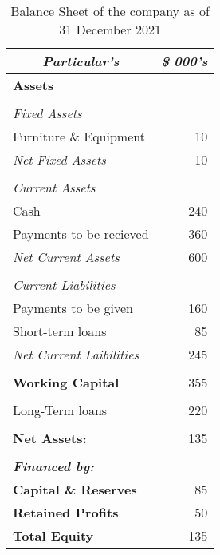 \begin{table}[H]
  \centering
  \caption{Balance Sheet of the company as of 31 December 2021}
    \begin{tabular}{|l|r|}
    \hline
    \hline
    \toprule
    \multicolumn{1}{|c|}{\textit{\textbf{Particular's}}} & \multicolumn{1}{c|}{\textit{\textbf{\$ 000's}}} \\
    \hline
    \hline
    \midrule
    \textbf{Assets} &  \\
    \midrule
          &  \\
    \midrule
    \textit{Fixed Assets} &  \\
    \midrule
    Furniture \& Equipment & 10 \\
    \midrule
    \textit{Net Fixed Assets} & 10 \\
    \midrule
          &  \\
    \midrule
    \textit{Current Assets} &  \\
    \midrule
    Cash  & 240 \\
    \midrule
    Payments to be recieved  & 360 \\
    \midrule
    \textit{Net Current Assets} & 600 \\
    \midrule
          &  \\
    \midrule
    \textit{Current Liabilities} &  \\
    \midrule
    Payments to be given & 160 \\
    \midrule
    Short-term loans & 85 \\
    \midrule
    \textit{Net Current Laibilities} & 245 \\
    \midrule
          &  \\
    \midrule
    \textbf{Working Capital} & 355 \\
    \midrule
          &  \\
    \midrule
    Long-Term loans & 220 \\
    \midrule
          &  \\
    \midrule
    \textbf{Net Assets:} & 135 \\
    \midrule
          &  \\
    \midrule
    \textit{\textbf{Financed by:}} &  \\
    \midrule
    \textbf{Capital \& Reserves} & 85 \\
    \midrule
    \textbf{Retained Profits} & 50 \\
    \midrule
    \textbf{Total Equity} & 135 \\
    \bottomrule
    \hline
    \hline
    \end{tabular}%
  \label{tab:addlabel}%
\end{table}%

